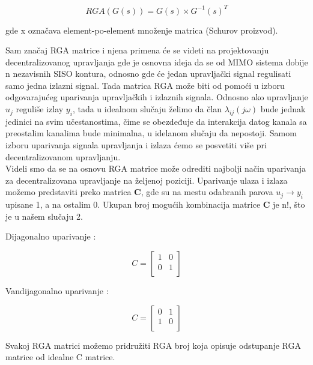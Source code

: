 \documentclass[a4paper,11pt]{article}
\theoremstyle{definition} \newtheorem{deff}{Definicija}[section]
\theoremstyle{definition} \newtheorem{prim}[deff]{Primer}
\theoremstyle{plain} \newtheorem{teor}[deff]{Teorema}
\begin{document}
	\begin{equation}
		RGA(G(s)) = G(s) \times G^{-1}(s)^T
	\end{equation}
	
	\noindent gde x označava element-po-element množenje matrica (Schurov proizvod). \\
	\clearpage
	
	Sam značaj RGA matrice i njena primena će se videti na projektovanju decentralizovanog upravljanja gde je osnovna ideja da se od MIMO sistema dobije n nezavisnih SISO kontura, odnosno gde će jedan upravljački signal regulisati samo jedna izlazni signal. Tada matrica RGA može biti od pomoći u izboru odgovarajućeg uparivanja upravljačkih i izlaznih signala. Odnosno ako upravljanje $u_j$ reguliše izlay $y_i$, tada u idealnom slučaju želimo da član $\lambda_{ij}(j\omega)$ bude jednak jedinici na svim učestanostima, čime se obezdeđuje da interakcija datog kanala sa preostalim kanalima bude minimalna, u idelanom slučaju da nepostoji. Samom izboru uparivanja signala upravljanja i izlaza ćemo se posvetiti više pri decentralizovanom upravljanju. \\
	
	Videli smo da se na osnovu RGA matrice može odrediti najbolji način uparivanja za decentralizovana upravljanje na željenoj poziciji. Uparivanje ulaza i izlaza možemo predstaviti preko matrica \textbf{C}, gde su na mestu odabranih parova $u_j \rightarrow y_i$ upisane 1, a na ostalim 0. Ukupan broj mogućih kombinacija matrice \textbf{C} je n!, što je u našem slučaju 2. 
	
	Dijagonalno uparivanje :
	
	\begin{equation}
		C = \begin{bmatrix}
			1 & 0 \\
			0 & 1 \\
		\end{bmatrix}
	\end{equation}
	
	Vandijagonalno uparivanje :
	
	\begin{equation}
		C = \begin{bmatrix}
			0 & 1 \\
			1 & 0 \\
		\end{bmatrix}
	\end{equation}
	
	Svakoj RGA matrici možemo pridružiti RGA broj koja opisuje odstupanje RGA matrice od idealne C matrice. 
	
\end{document}
